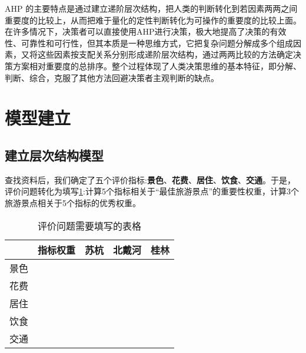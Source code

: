 \documentclass[withoutpreface]{cumcmthesis}
\begin{document}
    AHP 的主要特点是通过建立递阶层次结构，把人类的判断转化到若因素两两之间重要度的比较上，从而把难于量化的定性判断转化为可操作的重要度的比较上面。在许多情况下，决策者可以直接使用AHP进行决策，极大地提高了决策的有效性、可靠性和可行性，但其本质是一种思维方式，它把复杂问题分解成多个组成因素，又将这些因素按支配关系分别形成递阶层次结构，通过两两比较的方法确定决策方案相对重要度的总排序。整个过程体现了人类决策思维的基本特征，即分解、判断、综合，克服了其他方法回避决策者主观判断的缺点。

    \section{模型建立}

    \subsection{建立层次结构模型}

    查找资料后，我们确定了五个评价指标:\textbf{景色}、\textbf{花费}、\textbf{居住}、\textbf{饮食}、\textbf{交通}。于是，评价问题转化为填写\cref{Tab:1}:计算5个指标相关于“最佳旅游景点”的重要性权重，计算3个旅游景点相关于5个指标的优秀权重。

    \begin{table}[H]
        \centering
        \caption{评价问题需要填写的表格}\label{Tab:1}
        \begin{tabular}{|p{1.5cm}<{\centering}|p{2cm}<{\centering}|p{1.5cm}<{\centering}|p{1.5cm}<{\centering}|p{1.5cm}<{\centering}|}
        \hline
        &  指标权重 & 苏杭 & 北戴河 & 桂林 \\
        \hline
        景色   & \cellcolor{color9} & \cellcolor{color6} & \cellcolor{color6} & \cellcolor{color6} \bigstrut\\
        \hline
        花费   & \cellcolor{color9} & \cellcolor{color10} & \cellcolor{color10} & \cellcolor{color10} \bigstrut\\
        \hline
        居住   & \cellcolor{color9} & \cellcolor{color4} & \cellcolor{color4} & \cellcolor{color4} \bigstrut\\
        \hline
        饮食& \cellcolor{color9} & \cellcolor{color12} & \cellcolor{color12} & \cellcolor{color12} \\
        \hline
        交通& \cellcolor{color9} & \cellcolor{color8} & \cellcolor{color8} & \cellcolor{color8} \\
        \hline
        \end{tabular}
    \end{table}
\end{document}
